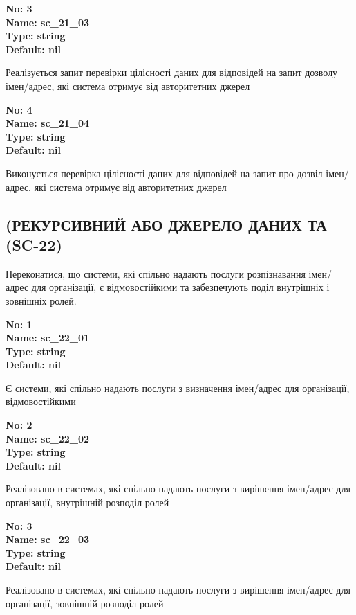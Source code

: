 \documentclass{article}
\begin{document}
{\footnotesize\bfseries
No: 3\\
Name: sc\_\allowbreak{}21\_\allowbreak{}03\\
Type: string\\
Default: nil
}

{\footnotesize Реалізується запит перевірки цілісності даних для відповідей на запит дозволу імен/адрес, які система отримує від авторитетних джерел}


{\footnotesize\bfseries
No: 4\\
Name: sc\_\allowbreak{}21\_\allowbreak{}04\\
Type: string\\
Default: nil
}

{\footnotesize Виконується перевірка цілісності даних для відповідей на запит про дозвіл імен/адрес, які система отримує від авторитетних джерел}




\subsection{(РЕКУРСИВНИЙ АБО ДЖЕРЕЛО ДАНИХ ТА (SC-22)}
Переконатися, що системи, які спільно надають послуги розпізнавання імен/адрес для організації, є відмовостійкими та забезпечують поділ внутрішніх і зовнішніх ролей.

\vspace{10pt}
{\footnotesize\bfseries
No: 1\\
Name: sc\_\allowbreak{}22\_\allowbreak{}01\\
Type: string\\
Default: nil
}

{\footnotesize Є системи, які спільно надають послуги з визначення імен/адрес для організації, відмовостійкими}


{\footnotesize\bfseries
No: 2\\
Name: sc\_\allowbreak{}22\_\allowbreak{}02\\
Type: string\\
Default: nil
}

{\footnotesize Реалізовано в системах, які спільно надають послуги з вирішення імен/адрес для організації, внутрішній розподіл ролей}


{\footnotesize\bfseries
No: 3\\
Name: sc\_\allowbreak{}22\_\allowbreak{}03\\
Type: string\\
Default: nil
}

{\footnotesize Реалізовано в системах, які спільно надають послуги з вирішення імен/адрес для організації, зовнішній розподіл ролей}
\end{document}
